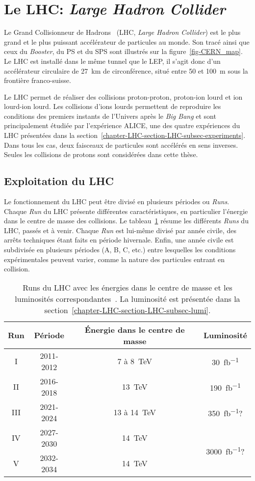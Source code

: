 \section{Le LHC: \emph{Large Hadron Collider}}\label{chapter-LHC-section-LHC}
Le Grand Collisionneur de Hadrons~\cite{LHC_paper1,LHC_paper2,LHC_paper3} (LHC, \emph{Large Hadron Collider}) est le plus grand et le plus puissant accélérateur de particules au monde.
Son tracé ainsi que ceux du \emph{Booster}, du PS et du SPS sont illustrés sur la figure~\ref{fig-CERN_map}.
Le LHC est installé dans le même tunnel que le LEP, il s'agit donc d'un accélérateur circulaire de \SI{27}{\kilo\meter} de circonférence, situé entre \num{50} et \SI{100}{\meter} sous la frontière franco-suisse.
\par Le LHC permet de réaliser des collisions proton-proton, proton-ion lourd et ion lourd-ion lourd.
Les collisions d'ions lourds permettent de reproduire les conditions des premiers instants de l'Univers après le \emph{Big Bang} et sont principalement étudiée par l'expérience ALICE, une des quatre expériences du LHC présentées dans la section~\ref{chapter-LHC-section-LHC-subsec-experiments}.
Dans tous les cas, deux faisceaux de particules sont accélérés en sens inverses.
Seules les collisions de protons sont considérées dans cette thèse.
\subsection{Exploitation du LHC}\label{chapter-LHC-section-LHC-subsec-LHC_runs}
Le fonctionnement du LHC peut être divisé en plusieurs périodes ou \emph{Runs}.
Chaque \emph{Run} du LHC présente différentes caractéristiques, en particulier l'énergie dans le centre de masse des collisions.
Le tableau~\ref{tab-LHC_runs} résume les différents \emph{Runs} du LHC, passés et à venir.
Chaque \emph{Run} est lui-même divisé par année civile, des arrêts techniques étant faits en période hivernale.
Enfin, une année civile est subdivisée en plusieurs périodes (A, B, C, etc.) entre lesquelles les conditions expérimentales peuvent varier, comme la nature des particules entrant en collision.
\begin{table}[h]
\centering
\begin{tabular}{cccc}
\toprule
Run & Période & Énergie dans le centre de masse & Luminosité\\
\midrule
I & 2011-2012 & 7 à \SI{8}{\TeV} & \SI{30}{\femto\barn^{-1}} \\
II & 2016-2018 & \SI{13}{\TeV} & \SI{190}{\femto\barn^{-1}} \\
III & 2021-2024 & 13 à \SI{14}{\TeV} & \SI{350}{\femto\barn^{-1}}? \\
IV & 2027-2030 & \SI{14}{\TeV} & \multirow{2}{*}{\SI{3000}{\femto\barn^{-1}}?}\\
V & 2032-2034 & \SI{14}{\TeV} & \\
\bottomrule
\end{tabular}
\caption[Runs du LHC.]{Runs du LHC avec les énergies dans le centre de masse et les luminosités correspondantes~\cite{LHC_commissioning}. La luminosité est présentée dans la section~\ref{chapter-LHC-section-LHC-subsec-lumi}.}
\label{tab-LHC_runs}
\end{table}
